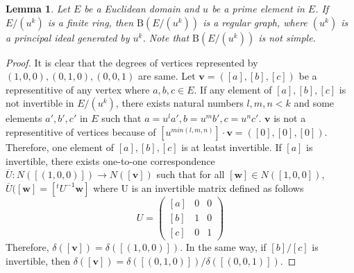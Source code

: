 \documentclass{article}
\newtheorem{Lem}{Lemma}
\newtheorem{Cor}[Lem]{Corollary}
\newcommand{\B}{\mathrm{B}}
\begin{document}
\iffalse

\begin{Lem}
Let $R_1, R_2$ be rings with unit. 
\[ \B(R_1 \times R_2) \simeq \B(R_1) \otimes \B(R_2) \]
\end{Lem}

\begin{Cor}
The followig equations hold.
\begin{enumerate}
\item $ | \B(R_1 \times R_2) | = | \B(R_1) | \times | \B(R_2) | $
\item $ \Delta(\B(R_1 \times R_2)) = \Delta(\B(R_1)) \times \Delta( \B(R_2) )$
\end{enumerate}
\end{Cor}

\fi 

\begin{Lem}\label{Lem:regular}
Let $E$ be a Euclidean domain and $u$ be a prime element in $E$. If $E/(u^k)$ is a finite ring, then $\B(E/(u^k))$ is a regular graph, where $(u^k)$ is a principal ideal generated by $u^k$. Note that $\B(E/(u^k))$ is not simple.
\end{Lem}

\begin{proof}
It is clear that the degrees of vertices represented by $(1,0,0), (0,1,0), (0,0,1)$ are same.
Let ${\bm v} = ([a],[b],[c])$ be a representitive of any vertex where $a,b,c \in E$. 
If any element of $[a],[b],[c]$ is not invertible in $E/(u^k)$, 
there exists natural numbers $l,m,n < k$ and some elements $a',b',c'$ in $E$ such that $a=u^l a', b=u^m b', c=u^n c'$. ${\bm v}$ is not a representitive of vertices because of $[u^{min(l,m,n)}] \cdot {\bm v} = ([0],[0],[0])$. 
Therefore, one element of $[a],[b],[c]$ is at leatst invertible.
If $[a]$ is invertible, there exists one-to-one correspondence $\overline{U}: N([(1,0,0)])  \rightarrow N([{\bm v}])$ such that for all $[{\bm w}] \in N([1,0,0])$, $\overline{U}([\bm w] = [ {}^t\!U^{-1} {\bm w} ]$ where U is an invertible matrix defined as follows
\[
 U = \left(
 \begin{matrix}
  [a] & 0 & 0 \\
  [b] & 1 & 0 \\
  [c] & 0 & 1
 \end{matrix} \right)
\]
Therefore, $\delta([\bm v]) = \delta([(1,0,0)])$. In the same way, if $[b]/[c]$ is invertible, then $\delta([\bm v]) = \delta([(0,1,0)])/\delta([(0,0,1)])$. 

\end{proof}
\end{document}

